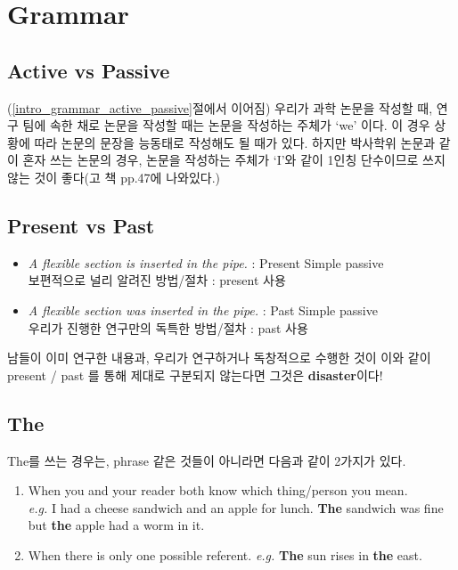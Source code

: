 \documentclass[10pt]{report}
\begin{document}
	\section{Grammar}
	
	\subsection{Active vs Passive} \label{method_grammar_active_passive}            
	(\ref{intro_grammar_active_passive}절에서 이어짐)
	우리가 과학 논문을 작성할 때, 연구 팀에 속한 채로 논문을 작성할 때는 논문을 작성하는 주체가 `we' 이다. 이 경우 상황에 따라 논문의 문장을 능동태로 작성해도 될 때가 있다. 하지만 박사학위 논문과 같이 혼자 쓰는 논문의 경우, 논문을 작성하는 주체가 `I'와 같이 1인칭 단수이므로 쓰지 않는 것이 좋다(고 책 pp.47에 나와있다.)
	
	\subsection{Present vs Past}
	\begin{itemize}
		\item {\it A flexible section is inserted in the pipe.} : Present Simple passive \\
		보편적으로 널리 알려진 방법/절차 : present 사용
		\item {\it A flexible section was inserted in the pipe.} : Past Simple passive \\
		우리가 진행한 연구만의 독특한 방법/절차 : past 사용
	\end{itemize}
	남들이 이미 연구한 내용과, 우리가 연구하거나 독창적으로 수행한 것이 이와 같이 present / past 를 통해 제대로 구분되지 않는다면 그것은 \textbf{disaster}이다!
	
	\subsection{The}
	The를 쓰는 경우는, phrase 같은 것들이 아니라면 다음과 같이 2가지가 있다.
	\begin{enumerate}
		\item When you and your reader both know which thing/person you mean.\\
		{\it e.g.} I had a cheese sandwich and an apple for lunch. {\bf The} sandwich was fine but {\bf the} apple had a worm in it.
		\item When there is only one possible referent.
		{\it e.g.} {\bf The} sun rises in {\bf the} east.
	\end{enumerate}
	
\end{document}
